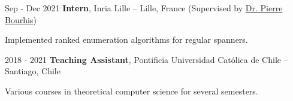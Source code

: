 \vspace{0.2 cm}

\begin{twocolentry}{
    Sep - Dec 2021
}
    \textbf{Intern}, Inria Lille -- Lille, France {\footnotesize (Supervised by \href{https://www.linkedin.com/in/pierre-bourhis-709a1827/?originalSubdomain=fr/}{Dr. Pierre Bourhis})}
\end{twocolentry}

\vspace{0.10 cm}
\begin{onecolentry}
    \begin{highlights}
        \item Implemented ranked enumeration algorithms for regular spanners.
    \end{highlights}
\end{onecolentry}

\vspace{0.2 cm}

\begin{twocolentry}{
    2018 - 2021
}
    \textbf{Teaching Assistant}, Pontificia Universidad Católica de Chile -- Santiago, Chile\end{twocolentry}

\vspace{0.10 cm}
\begin{onecolentry}
    \begin{highlights}
        \item Various courses in theoretical computer science for several semesters.
    \end{highlights}
\end{onecolentry} 